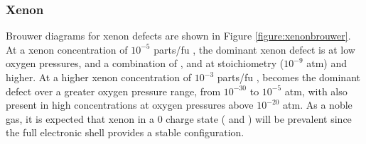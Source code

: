 

\subsubsection{Xenon}

Brouwer diagrams for xenon defects are shown in Figure \ref{figure:xenonbrouwer}. At a xenon concentration of $10^{-5}$ parts/fu \zirconia , the dominant xenon defect is  at low oxygen pressures, and a combination of ,  and  at stoichiometry ($10^{-9}$ atm) and higher. At a higher xenon concentration of $10^{-3}$ parts/fu \zirconia ,  becomes the dominant defect over a greater oxygen pressure range, from $10^{-30}$ to $10^{-5}$ atm, with  also present in high concentrations at oxygen pressures above $10^{-20}$ atm. As a noble gas, it is expected that xenon in a 0 charge state ( and ) will be prevalent since the full electronic shell provides a stable configuration.

